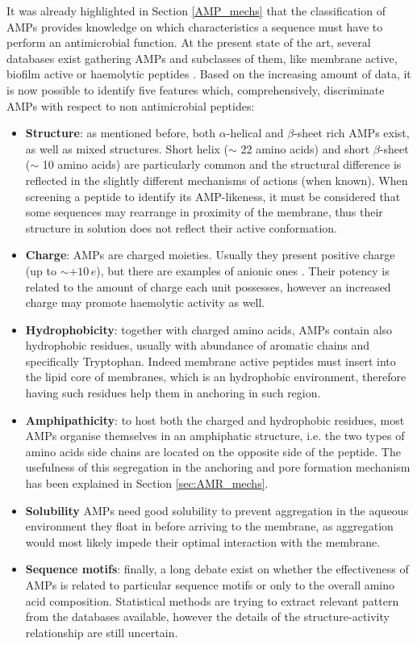 It was already highlighted in Section \ref{AMP_mechs} that the classification of AMPs provides knowledge on which characteristics a sequence must have to perform an antimicrobial function.
%
At the present state of the art, several databases exist gathering AMPs and subclasses of them, like membrane active, biofilm active or haemolytic peptides \cite{APD3, ???}. Based on the increasing amount of data, it is now possible to identify five features which, comprehensively, discriminate AMPs with respect to non antimicrobial peptides:
%
\begin{itemize}
\item \textbf{Structure}: as mentioned before, both $\alpha$-helical and $\beta$-sheet rich AMPs exist, as well as mixed structures. Short helix ($\sim$ 22 amino acids) \cite{???} and short $\beta$-sheet ($\sim$ 10 amino acids) \cite{???} are particularly common and the structural difference is reflected in the slightly different mechanisms of actions (when known). When screening a peptide to identify its AMP-likeness, it must be considered that some sequences may rearrange in proximity of the membrane, thus their structure in solution does not reflect their active conformation.
\item \textbf{Charge}: AMPs are charged moieties. Usually they present positive charge (up to $\sim + 10\,e$), but there are examples of anionic ones \cite{???see_example_on_AMPR}. Their potency is related to the amount of charge each unit possesses, however an increased charge may promote haemolytic activity as well. \cite{???}
\item \textbf{Hydrophobicity}: together with charged amino acids, AMPs contain also hydrophobic residues, usually with abundance of aromatic chains and specifically Tryptophan. Indeed membrane active peptides must insert into the lipid core of membranes, which is an hydrophobic environment, therefore having such residues help them in anchoring in such region.
\item \textbf{Amphipathicity}: to host both the charged and hydrophobic residues, most AMPs organise themselves in an amphiphatic structure, i.e. the two types of amino acids side chains are located on the opposite side of the peptide. The usefulness of this segregation in the anchoring and pore formation mechanism has been explained in Section \ref{sec:AMR_mechs}.
\item \textbf{Solubility} AMPs need good solubility to prevent aggregation in the aqueous environment they float in before arriving to the membrane, as aggregation would most likely impede their optimal interaction with the membrane.
\item \textbf{Sequence motifs}: finally, a long debate exist on whether the effectiveness of AMPs is related to particular sequence motifs or only to the overall amino acid composition. Statistical methods are trying to extract relevant pattern from the databases available, however the details of the structure-activity relationship are still uncertain.
\end{itemize}
